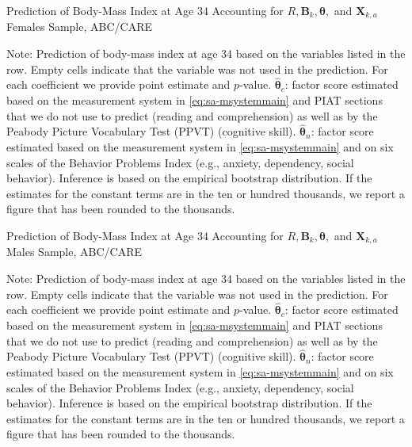 \begin{table}
\begin{threeparttable}
\caption{Prediction of Body-Mass Index at Age 34 Accounting for $R, \bm{B}_k, \bm{\theta},$ and $\bm{X}_{k,a}$ Females Sample, ABC/CARE}
\centering
\scriptsize

\begin{tablenotes}
\footnotesize
\item Note: Prediction of body-mass index at age 34 based on the variables listed in the row. Empty cells indicate that the variable was not used in the prediction. For each coefficient we provide point estimate and $p$-value. $\hat{\bm{\theta}}_{c}$: factor score estimated based on the measurement system in \eqref{eq:sa-msystemmain} and PIAT sections that we do not use to predict (reading and comprehension) as well as by the Peabody Picture Vocabulary Test (PPVT) (cognitive skill). $\hat{\bm{\theta}}_{n}$: factor score estimated based on the measurement system in \eqref{eq:sa-msystemmain} and on six scales of the Behavior Problems Index (e.g., anxiety, dependency, social behavior). Inference is based on the empirical bootstrap distribution. If the estimates for the constant terms are in the ten or hundred thousands, we report a figure that has been rounded to the thousands.
\end{tablenotes}
\end{threeparttable}
\end{table}

\begin{table}
\begin{threeparttable}
\caption{Prediction of Body-Mass Index at Age 34 Accounting for $R, \bm{B}_k, \bm{\theta},$ and $\bm{X}_{k,a}$ Males Sample, ABC/CARE}
\label{table:end3}
\centering
\scriptsize

\begin{tablenotes}
\footnotesize
\item Note: Prediction of body-mass index at age 34 based on the variables listed in the row. Empty cells indicate that the variable was not used in the prediction. For each coefficient we provide point estimate and $p$-value. $\hat{\bm{\theta}}_{c}$: factor score estimated based on the measurement system in \eqref{eq:sa-msystemmain} and PIAT sections that we do not use to predict (reading and comprehension) as well as by the Peabody Picture Vocabulary Test (PPVT) (cognitive skill). $\hat{\bm{\theta}}_{n}$: factor score estimated based on the measurement system in \eqref{eq:sa-msystemmain} and on six scales of the Behavior Problems Index (e.g., anxiety, dependency, social behavior). Inference is based on the empirical bootstrap distribution. If the estimates for the constant terms are in the ten or hundred thousands, we report a figure that has been rounded to the thousands.
\end{tablenotes}
\end{threeparttable}
\end{table}

